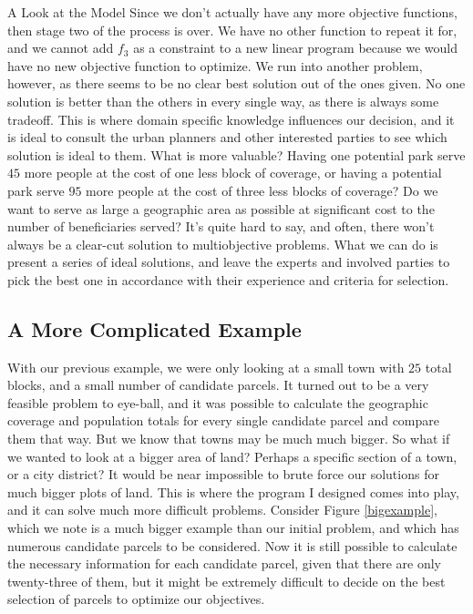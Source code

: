 \documentclass[12pt]{pom_thesis}
\theoremstyle{definition}
\begin{document}
\begin{chapter}{A Look at the Model}
Since we don't actually have any more objective functions, then stage two of the process is over. We have no other function to repeat it for, and we cannot add $f_3$ as a constraint to a new linear program because we would have no new objective function to optimize. We run into another problem, however, as there seems to be no clear best solution out of the ones given. No one solution is better than the others in every single way, as there is always some tradeoff. This is where domain specific knowledge influences our decision, and it is ideal to consult the urban planners and other interested parties to see which solution is ideal to them. What is more valuable? Having one potential park serve $45$ more people at the cost of one less block of coverage, or having a potential park serve $95$ more people at the cost of three less blocks of coverage? Do we want to serve as large a geographic area as possible at significant cost to the number of beneficiaries served? It's quite hard to say, and often, there won't always be a clear-cut solution to multiobjective problems. What we can do is present a series of ideal solutions, and leave the experts and involved parties to pick the best one in accordance with their experience and criteria for selection.
%
%
\subsection{A More Complicated Example}

With our previous example, we were only looking at a small town with $25$ total blocks, and a small number of candidate parcels. It turned out to be a very feasible problem to eye-ball, and it was possible to calculate the geographic coverage and population totals for every single candidate parcel and compare them that way. But we know that towns may be much much bigger. So what if we wanted to look at a bigger area of land? Perhaps a specific section of a town, or a city district? It would be near impossible to brute force our solutions for much bigger plots of land. This is where the program I designed comes into play, and it can solve much more difficult problems. Consider Figure \ref{bigexample}, which we note is a much bigger example than our initial problem, and which has numerous candidate parcels to be considered. Now it is still possible to calculate the necessary information for each candidate parcel, given that there are only twenty-three of them, but it might be extremely difficult to decide on the best selection of parcels to optimize our objectives. \\


\end{chapter}
\end{document}

